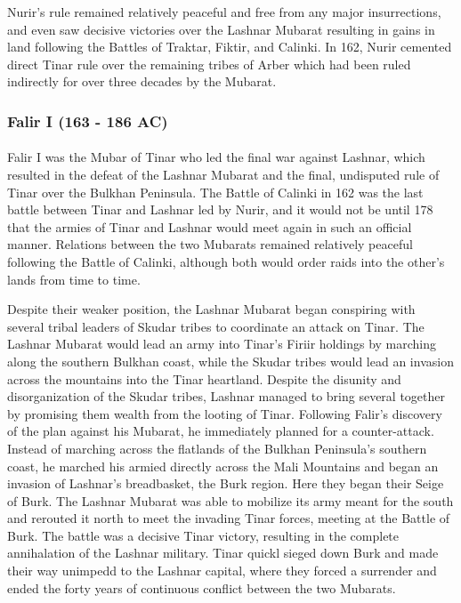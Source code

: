 Nurir's rule remained relatively peaceful and free from any major insurrections, and even saw decisive victories over the Lashnar Mubarat resulting in gains in land following the Battles of Traktar, Fiktir, and Calinki. In 162, Nurir cemented direct Tinar rule over the remaining tribes of Arber which had been ruled indirectly for over three decades by the Mubarat.
\subsubsection{Falir I (163 - 186 AC)}
\paragraph{}
Falir I was the Mubar of Tinar who led the final war against Lashnar, which resulted in the defeat of the Lashnar Mubarat and the final, undisputed rule of Tinar over the Bulkhan Peninsula. The Battle of Calinki in 162 was the last battle between Tinar and Lashnar led by Nurir, and it would not be until 178 that the armies of Tinar and Lashnar would meet again in such an official manner. Relations between the two Mubarats remained relatively peaceful following the Battle of Calinki, although both would order raids into the other's lands from time to time. 

Despite their weaker position, the Lashnar Mubarat began conspiring with several tribal leaders of Skudar tribes to coordinate an attack on Tinar. The Lashnar Mubarat would lead an army into Tinar's Firiir holdings by marching along the southern Bulkhan coast, while the Skudar tribes would lead an invasion across the mountains into the Tinar heartland. Despite the disunity and disorganization of the Skudar tribes, Lashnar managed to bring several together by promising them wealth from the looting of Tinar. Following Falir's discovery of the plan against his Mubarat, he immediately planned for a counter-attack. Instead of marching across the flatlands of the Bulkhan Peninsula's southern coast, he marched his armied directly across the Mali Mountains and began an invasion of Lashnar's breadbasket, the Burk region. Here they began their Seige of Burk. The Lashnar Mubarat was able to mobilize its army meant for the south and rerouted it north to meet the invading Tinar forces, meeting at the Battle of Burk. The battle was a decisive Tinar victory, resulting in the complete annihalation of the Lashnar military. Tinar quickl sieged down Burk and made their way unimpedd to the Lashnar capital, where they forced a surrender and ended the forty years of continuous conflict between the two Mubarats.

